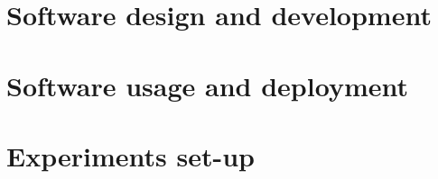 
\section{Software design and development}
    

\section{Software usage and deployment}
    

\section{Experiments set-up}
    